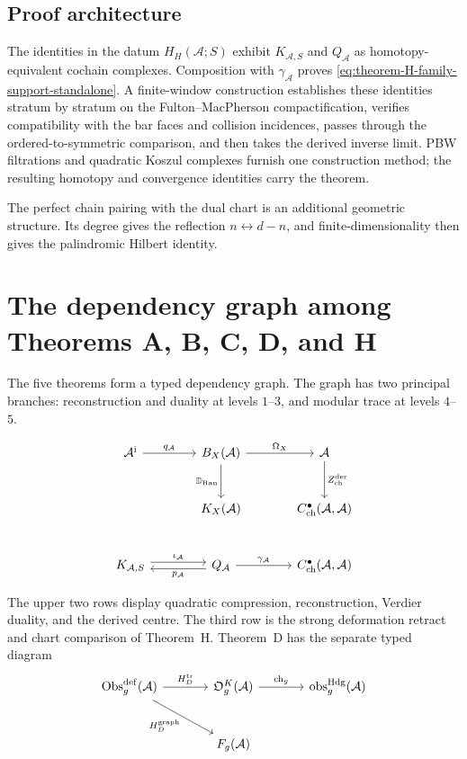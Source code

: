 \documentclass[11pt]{article}
\theoremstyle{plain}
\theoremstyle{definition}
\theoremstyle{remark}
\newcommand{\Ran}{\mathrm{Ran}}
\newcommand{\cA}{\mathcal{A}}
\begin{document}
\subsection{Proof architecture}

The identities in the datum $H_H(\cA;S)$ exhibit
$K_{\cA,S}$ and $Q_\cA$ as homotopy-equivalent cochain complexes.
Composition with $\gamma_\cA$ proves
\eqref{eq:theorem-H-family-support-standalone}.  A finite-window
construction establishes these identities stratum by stratum on the
Fulton--MacPherson compactification, verifies compatibility with the
bar faces and collision incidences, passes through the
ordered-to-symmetric comparison, and then takes the derived inverse
limit.  PBW filtrations and quadratic Koszul complexes furnish one
construction method; the resulting homotopy and convergence
identities carry the theorem.

The perfect chain pairing with the dual chart is an additional
geometric structure.  Its degree gives the reflection
$n\leftrightarrow d-n$, and finite-dimensionality then gives the
palindromic Hilbert identity.



\section{The dependency graph among Theorems A, B, C, D, and H}
\label{sec:forced-chain}

The five theorems form a typed dependency graph.  The graph has two
principal branches: reconstruction and duality at levels \(1\)--\(3\),
and modular trace at levels \(4\)--\(5\).

\[
\begin{tikzcd}[column sep=large,row sep=large]
 \cA^{\mathrm i}
   \arrow[r,"q_\cA"]
 & B_X(\cA)
   \arrow[r,"\Omega_X"]
   \arrow[d,"\mathbb D_{\Ran}"']
 & \cA
   \arrow[d,"Z^{\mathrm{der}}_{\mathrm{ch}}"] \\
 & K_X(\cA)
 & C^\bullet_{\mathrm{ch}}(\cA,\cA) \\
 K_{\cA,S}
   \arrow[r,shift left=.6ex,"\iota_\cA"]
 & Q_\cA
   \arrow[l,shift left=.6ex,"p_\cA"]
   \arrow[r,"\gamma_\cA"]
 & C^\bullet_{\mathrm{ch}}(\cA,\cA)
\end{tikzcd}
\]

The upper two rows display quadratic compression, reconstruction,
Verdier duality, and the derived centre.  The third row is the strong
deformation retract and chart comparison of Theorem~H.  Theorem~D has
the separate typed diagram
\[
\begin{tikzcd}[column sep=large,row sep=large]
 \operatorname{Obs}^{\mathrm{def}}_g(\cA)
   \arrow[r,"H_D^{\mathrm{tr}}"]
   \arrow[dr,"H_D^{\mathrm{graph}}"']
 & \mathfrak O_g^K(\cA)
   \arrow[r,"\operatorname{ch}_g"]
 & \operatorname{obs}^{\mathrm{Hdg}}_g(\cA) \\
 & F_g(\cA) &
\end{tikzcd}
\]
\end{document}
